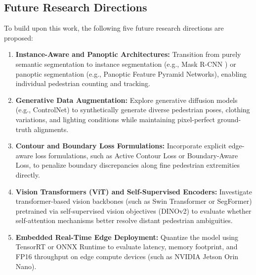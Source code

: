 \documentclass[10pt,a4paper]{article}
\begin{document}
\subsection{Future Research Directions}
To build upon this work, the following five future research directions are proposed:
\begin{enumerate}
    \item \textbf{Instance-Aware and Panoptic Architectures:} Transition from purely semantic segmentation to instance segmentation (e.g., Mask R-CNN \cite{he2017maskrcnn}) or panoptic segmentation (e.g., Panoptic Feature Pyramid Networks), enabling individual pedestrian counting and tracking.
    \item \textbf{Generative Data Augmentation:} Explore generative diffusion models (e.g., ControlNet) to synthetically generate diverse pedestrian poses, clothing variations, and lighting conditions while maintaining pixel-perfect ground-truth alignments.
    \item \textbf{Contour and Boundary Loss Formulations:} Incorporate explicit edge-aware loss formulations, such as Active Contour Loss or Boundary-Aware Loss, to penalize boundary discrepancies along fine pedestrian extremities directly.
    \item \textbf{Vision Transformers (ViT) and Self-Supervised Encoders:} Investigate transformer-based vision backbones (such as Swin Transformer or SegFormer) pretrained via self-supervised vision objectives (DINOv2) to evaluate whether self-attention mechanisms better resolve distant pedestrian ambiguities.
    \item \textbf{Embedded Real-Time Edge Deployment:} Quantize the model using TensorRT or ONNX Runtime to evaluate latency, memory footprint, and FP16 throughput on edge compute devices (such as NVIDIA Jetson Orin Nano).
\end{enumerate}
\end{document}
